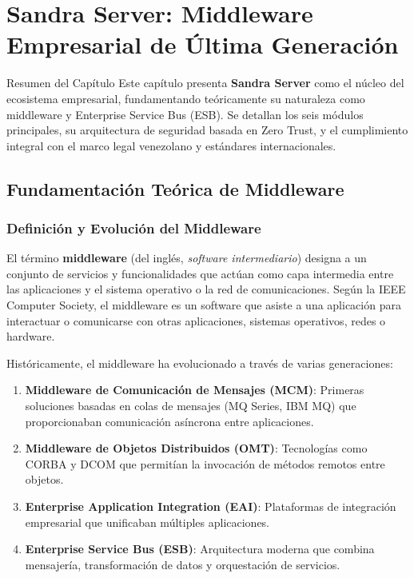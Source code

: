 \chapter{Sandra Server: Middleware Empresarial de Última Generación}

\thispagestyle{fancy}

\begin{caja}{Resumen del Capítulo}
Este capítulo presenta \textbf{Sandra Server} como el núcleo del ecosistema empresarial, fundamentando teóricamente su naturaleza como middleware y Enterprise Service Bus (ESB). Se detallan los seis módulos principales, su arquitectura de seguridad basada en Zero Trust, y el cumplimiento integral con el marco legal venezolano y estándares internacionales.
\end{caja}

\bigskip

\section{Fundamentación Teórica de Middleware}

\subsection{Definición y Evolución del Middleware}

El término \textbf{middleware} (del inglés, \textit{software intermediario}) designa a un conjunto de servicios y funcionalidades que actúan como capa intermedia entre las aplicaciones y el sistema operativo o la red de comunicaciones. Según la IEEE Computer Society, el middleware es un software que asiste a una aplicación para interactuar o comunicarse con otras aplicaciones, sistemas operativos, redes o hardware.

Históricamente, el middleware ha evolucionado a través de varias generaciones:

\begin{enumerate}
\item \textbf{Middleware de Comunicación de Mensajes (MCM)}: Primeras soluciones basadas en colas de mensajes (MQ Series, IBM MQ) que proporcionaban comunicación asíncrona entre aplicaciones.
\item \textbf{Middleware de Objetos Distribuidos (OMT)}: Tecnologías como CORBA y DCOM que permitían la invocación de métodos remotos entre objetos.
\item \textbf{Enterprise Application Integration (EAI)}: Plataformas de integración empresarial que unificaban múltiples aplicaciones.
\item \textbf{Enterprise Service Bus (ESB)}: Arquitectura moderna que combina mensajería, transformación de datos y orquestación de servicios.
\end{enumerate}

